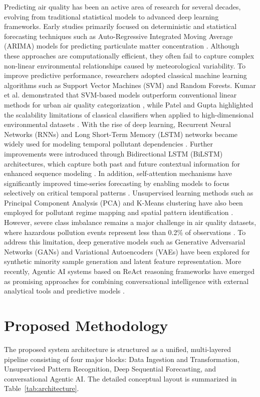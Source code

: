 \documentclass[conference]{IEEEtran}
\begin{document}
Predicting air quality has been an active area of research for several decades, evolving from traditional statistical models to advanced deep learning frameworks. Early studies primarily focused on deterministic and statistical forecasting techniques such as Auto-Regressive Integrated Moving Average (ARIMA) models for predicting particulate matter concentration \cite{zhang}. Although these approaches are computationally efficient, they often fail to capture complex non-linear environmental relationships caused by meteorological variability. To improve predictive performance, researchers adopted classical machine learning algorithms such as Support Vector Machines (SVM) and Random Forests. Kumar et al. demonstrated that SVM-based models outperform conventional linear methods for urban air quality categorization \cite{kumar}, while Patel and Gupta highlighted the scalability limitations of classical classifiers when applied to high-dimensional environmental datasets \cite{patel}. With the rise of deep learning, Recurrent Neural Networks (RNNs) and Long Short-Term Memory (LSTM) networks became widely used for modeling temporal pollutant dependencies \cite{sharma}. Further improvements were introduced through Bidirectional LSTM (BiLSTM) architectures, which capture both past and future contextual information for enhanced sequence modeling \cite{rao}. In addition, self-attention mechanisms have significantly improved time-series forecasting by enabling models to focus selectively on critical temporal patterns \cite{li}. Unsupervised learning methods such as Principal Component Analysis (PCA) and K-Means clustering have also been employed for pollutant regime mapping and spatial pattern identification \cite{singh}. However, severe class imbalance remains a major challenge in air quality datasets, where hazardous pollution events represent less than 0.2\% of observations \cite{cpcb}. To address this limitation, deep generative models such as Generative Adversarial Networks (GANs) \cite{goodfellow} and Variational Autoencoders (VAEs) \cite{kingma} have been explored for synthetic minority sample generation and latent feature representation. More recently, Agentic AI systems based on ReAct reasoning frameworks have emerged as promising approaches for combining conversational intelligence with external analytical tools and predictive models \cite{yao}.

\section{Proposed Methodology}
The proposed system architecture is structured as a unified, multi-layered pipeline consisting of four major blocks: Data Ingestion and Transformation, Unsupervised Pattern Recognition, Deep Sequential Forecasting, and conversational Agentic AI. The detailed conceptual layout is summarized in Table~\ref{tab:architecture}.
\end{document}
